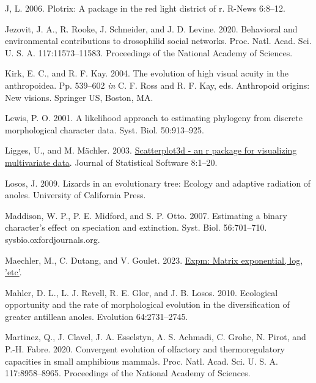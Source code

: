 \documentclass[fleqn,10pt,lineno]{wlpeerj} %
\newlength{\cslhangindent}
\newlength{\cslentryspacingunit} %
\newenvironment{CSLReferences}[2] %
 {%
  \setlength{\parindent}{0pt}
  \ifodd #1
  \let\oldpar\par
  \def\par{\hangindent=\cslhangindent\oldpar}
  \fi
  \setlength{\parskip}{#2\cslentryspacingunit}
 }%
 {}
\begin{document}
\begin{CSLReferences}{1}{0}
\leavevmode{}%
J, L. 2006. Plotrix: A package in the red light district of r. R-News 6:8--12.

\leavevmode{}%
Jezovit, J. A., R. Rooke, J. Schneider, and J. D. Levine. 2020. Behavioral and environmental contributions to drosophilid social networks. Proc. Natl. Acad. Sci. U. S. A. 117:11573--11583. Proceedings of the National Academy of Sciences.

\leavevmode{}%
Kirk, E. C., and R. F. Kay. 2004. The evolution of high visual acuity in the anthropoidea. Pp. 539--602 \emph{in} C. F. Ross and R. F. Kay, eds. Anthropoid origins: New visions. Springer US, Boston, MA.

\leavevmode{}%
Lewis, P. O. 2001. A likelihood approach to estimating phylogeny from discrete morphological character data. Syst. Biol. 50:913--925.

\leavevmode{}%
Ligges, U., and M. Mächler. 2003. \href{https://doi.org/10.18637/jss.v008.i11}{Scatterplot3d - an r package for visualizing multivariate data}. Journal of Statistical Software 8:1--20.

\leavevmode{}%
Losos, J. 2009. Lizards in an evolutionary tree: Ecology and adaptive radiation of anoles. University of California Press.

\leavevmode{}%
Maddison, W. P., P. E. Midford, and S. P. Otto. 2007. Estimating a binary character's effect on speciation and extinction. Syst. Biol. 56:701--710. sysbio.oxfordjournals.org.

\leavevmode{}%
Maechler, M., C. Dutang, and V. Goulet. 2023. \href{https://CRAN.R-project.org/package=expm}{Expm: Matrix exponential, log, 'etc'}.

\leavevmode{}%
Mahler, D. L., L. J. Revell, R. E. Glor, and J. B. Losos. 2010. Ecological opportunity and the rate of morphological evolution in the diversification of greater antillean anoles. Evolution 64:2731--2745.

\leavevmode{}%
Martinez, Q., J. Clavel, J. A. Esselstyn, A. S. Achmadi, C. Grohe, N. Pirot, and P.-H. Fabre. 2020. Convergent evolution of olfactory and thermoregulatory capacities in small amphibious mammals. Proc. Natl. Acad. Sci. U. S. A. 117:8958--8965. Proceedings of the National Academy of Sciences.


\end{CSLReferences}
\end{document}
